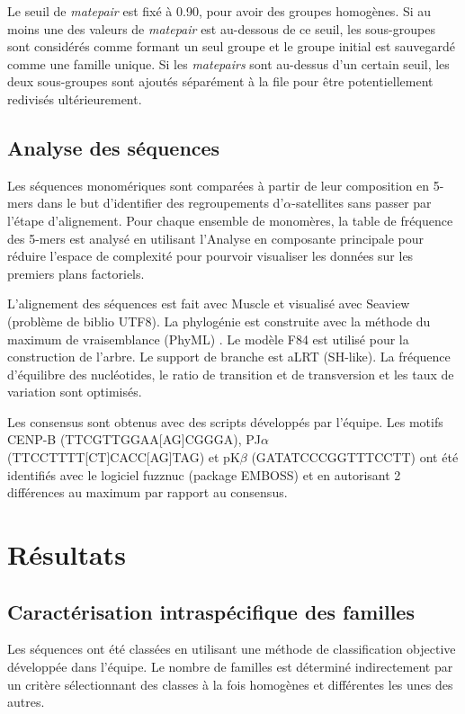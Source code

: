 \documentclass[12pt,a4paper]{article}
\begin{document}
Le seuil de \textit{matepair} est fixé à 0.90, pour avoir des groupes homogènes. Si au moins une des valeurs de \textit{matepair} est au-dessous de ce seuil, les sous-groupes sont considérés comme formant un seul groupe et le groupe initial est sauvegardé comme une famille unique. Si les \textit{matepairs} sont au-dessus d’un certain seuil, les deux sous-groupes sont ajoutés séparément à la file pour être potentiellement redivisés ultérieurement.

	\subsection{Analyse des séquences}
	
Les séquences monomériques sont comparées à partir de leur composition en 5-mers dans le but d'identifier des regroupements d'$\alpha$-satellites sans passer par l'étape d'alignement. Pour chaque ensemble de monomères,	la table de fréquence des 5-mers est analysé en utilisant l'Analyse en composante principale pour réduire l'espace de complexité pour pourvoir visualiser les données sur les premiers plans factoriels.
	
L'alignement des séquences est fait avec Muscle \cite{Edgar2004} et visualisé avec Seaview (problème de biblio UTF8). La phylogénie est construite avec la méthode du maximum de vraisemblance (PhyML) \cite{Guindon2009}. Le modèle F84 est utilisé pour la construction de l'arbre. Le support de branche est aLRT (SH-like). La fréquence d'équilibre des nucléotides, le ratio de transition et de transversion et les taux de variation sont optimisés.

Les consensus sont obtenus avec des scripts développés par l'équipe. Les motifs CENP-B (TTCGTTGGAA[AG]CGGGA), PJ$\alpha$ (TTCCTTTT[CT]CACC[AG]TAG) et pK$\beta$ (GATATCCCGGTTTCCTT) ont été identifiés avec le logiciel fuzznuc (package EMBOSS) \cite{Rice2000} et en autorisant 2 différences au maximum par rapport au consensus.

\section{Résultats}
	\subsection{Caractérisation intraspécifique des familles}
	Les séquences ont été classées en utilisant une méthode de classification objective développée dans l'équipe. Le nombre de familles est déterminé indirectement par un critère sélectionnant des classes à la fois homogènes et différentes les unes des autres.
	
\end{document}
